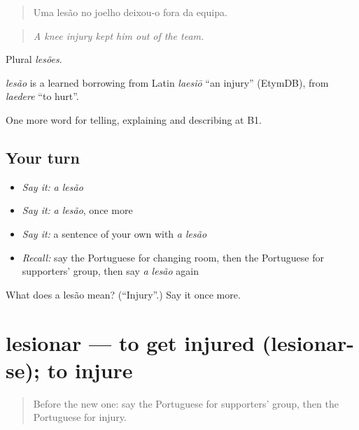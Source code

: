\begin{quote}
Uma lesão no joelho deixou-o fora da equipa.
\end{quote}

\begin{quote}
\emph{A knee injury kept him out of the team.}
\end{quote}

Plural \emph{lesões}.

\begin{cousinweb}
\emph{lesão} is a learned borrowing from Latin \emph{laesiō} \textquotedblleft{}an injury\textquotedblright{} (EtymDB), from \emph{laedere} \textquotedblleft{}to hurt\textquotedblright{}.
\end{cousinweb}

\begin{grammarlens}[title={What you've built}]
One more word for telling, explaining and describing at B1.
\end{grammarlens}

\subsection*{Your turn}
\begin{itemize}
\raggedright
  \item \emph{Say it:} \emph{a lesão}
  \item \emph{Say it:} \emph{a lesão}, once more
  \item \emph{Say it:} a sentence of your own with \emph{a lesão}
  \item \emph{Recall:} say the Portuguese for changing room, then the Portuguese for supporters' group, then say \emph{a lesão} again
\end{itemize}

\begin{tcolorbox}[breakable,colback=teal!4,colframe=teal!35!black,title={Before you move on}]
What does a lesão mean? (\textquotedblleft{}Injury\textquotedblright{}.) Say it once more.
\end{tcolorbox}
\section[lesionar]{lesionar — to get injured (lesionar-se); to injure}

\label{lesson:PT-C515-lesionar}



\begin{quote}
Before the new one: say the Portuguese for supporters' group, then the Portuguese for injury.
\end{quote}

